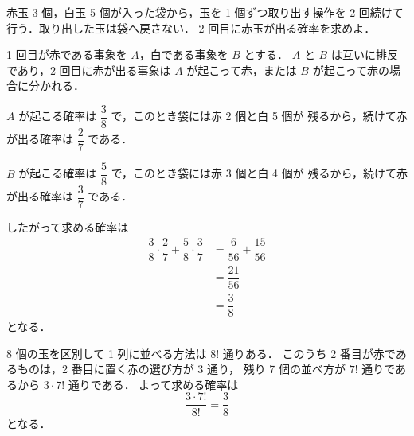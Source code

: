 \documentclass[lualatex,paper=b5j,fontsize=10pt,twoside]{jlreq}
\begin{document}
\MakeMathMagazineTitle

\begin{mmproblem}[1]{}
赤玉 3 個，白玉 5 個が入った袋から，玉を 1 個ずつ取り出す操作を
2 回続けて行う．取り出した玉は袋へ戻さない．
2 回目に赤玉が出る確率を求めよ．
\end{mmproblem}




\MSHintBreak

\begin{mmsolution}
1 回目が赤である事象を $A$，白である事象を $B$ とする．
$A$ と $B$ は互いに排反であり，2 回目に赤が出る事象は
$A$ が起こって赤，または $B$ が起こって赤の場合に分かれる．

$A$ が起こる確率は $\dfrac{3}{8}$ で，このとき袋には赤 2 個と白 5 個が
残るから，続けて赤が出る確率は $\dfrac{2}{7}$ である．

$B$ が起こる確率は $\dfrac{5}{8}$ で，このとき袋には赤 3 個と白 4 個が
残るから，続けて赤が出る確率は $\dfrac{3}{7}$ である．

したがって求める確率は
\begin{align*}
  \dfrac{3}{8}\cdot\dfrac{2}{7}+\dfrac{5}{8}\cdot\dfrac{3}{7}
    &= \dfrac{6}{56}+\dfrac{15}{56}\\
    &= \dfrac{21}{56}\\
    &= \dfrac{3}{8}
\end{align*}
となる．
\end{mmsolution}


8 個の玉を区別して 1 列に並べる方法は $8!$ 通りある．
このうち 2 番目が赤であるものは，2 番目に置く赤の選び方が 3 通り，
残り 7 個の並べ方が $7!$ 通りであるから $3\cdot 7!$ 通りである．
よって求める確率は
\[
  \dfrac{3\cdot 7!}{8!}=\dfrac{3}{8}
\]
となる．
\end{document}
